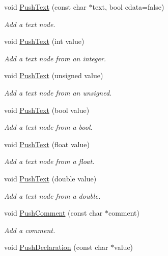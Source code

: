 \begin{DoxyCompactItemize}
void \hyperlink{classtinyxml2_1_1_x_m_l_printer_a1cc16a9362df4332012cb13cff6441b3}{Push\-Text} (const char $\ast$text, bool cdata=false)
\begin{DoxyCompactList}\small\item\em Add a text node. \end{DoxyCompactList}\item 
void \hyperlink{classtinyxml2_1_1_x_m_l_printer_a3e0d4d78de25d4cf081009e1431cea7e}{Push\-Text} (int value)
\begin{DoxyCompactList}\small\item\em Add a text node from an integer. \end{DoxyCompactList}\item 
void \hyperlink{classtinyxml2_1_1_x_m_l_printer_a661fb50e7e0a4918d2d259cb0fae647e}{Push\-Text} (unsigned value)
\begin{DoxyCompactList}\small\item\em Add a text node from an unsigned. \end{DoxyCompactList}\item 
void \hyperlink{classtinyxml2_1_1_x_m_l_printer_a4390e5fa1ed05189a8686647345ab29f}{Push\-Text} (bool value)
\begin{DoxyCompactList}\small\item\em Add a text node from a bool. \end{DoxyCompactList}\item 
void \hyperlink{classtinyxml2_1_1_x_m_l_printer_a1dbb1390e829d0673af66b9cd1928bd7}{Push\-Text} (float value)
\begin{DoxyCompactList}\small\item\em Add a text node from a float. \end{DoxyCompactList}\item 
void \hyperlink{classtinyxml2_1_1_x_m_l_printer_aa715302dfc09473c77c853cbd5431965}{Push\-Text} (double value)
\begin{DoxyCompactList}\small\item\em Add a text node from a double. \end{DoxyCompactList}\item 
void \hyperlink{classtinyxml2_1_1_x_m_l_printer_afc8416814219591c2fd5656e0c233140}{Push\-Comment} (const char $\ast$comment)
\begin{DoxyCompactList}\small\item\em Add a comment. \end{DoxyCompactList}\item 
void \hyperlink{classtinyxml2_1_1_x_m_l_printer_a2fe3565e262594efc6c0276723c83fe7}{Push\-Declaration} (const char $\ast$value)

\end{DoxyCompactItemize}
